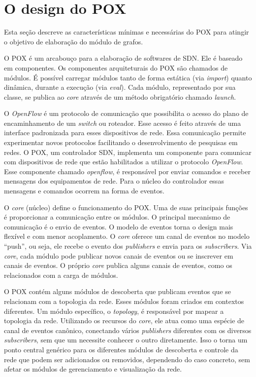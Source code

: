 \section{O design do POX}
\label{sec:design}

Esta seção descreve as características mínimas e necessárias do POX 
para atingir o objetivo de elaboração do módulo de grafos.

O POX é um arcabouço para a elaboração de softwares de SDN.
Ele é baseado em componentes.
Os componentes arquiteturais do POX são chamados de módulos.
É possível carregar módulos tanto de forma estática (via {\it import})
quanto dinâmica, durante a execução (via {\it eval}). 
Cada módulo, representado por sua classe, 
se publica ao \emph{core} através de um método obrigatório chamado \emph{launch}.

O \emph{OpenFlow} \citep{nick2008openflow} é um protocolo de comunicação
que possibilita o acesso do plano de encaminhamento de um \emph{switch} 
ou roteador.
Esse acesso é feito através de uma interface padronizada para esses
dispositivos de rede.
Essa comunicação permite experimentar novos protocolos facilitando 
o desenvolvimento de pesquisas em redes.
O POX, um controlador SDN, implementa um componente para comunicar com 
dispositivos de rede que estão habilitados a utilizar o protocolo 
\emph{OpenFlow}. 
Esse componente chamado \emph{openflow}, é responsável por enviar 
comandos e receber mensagens dos equipamentos de rede. 
Para o núcleo do controlador essas mensagens e comandos ocorrem na 
forma de eventos.

O \emph{core} (núcleo) define o funcionamento do POX. 
Uma de suas principais funções é proporcionar a comunicação entre os módulos.
O principal mecanismo de comunicação é o envio de eventos.
O modelo de eventos torna o design mais flexível e com menor acoplamento.
O \emph{core} oferece um canal de eventos no modelo ``push'',
ou seja, ele recebe o evento dos \emph{publishers} e envia para os \emph{subscribers}.
Via \emph{core}, cada módulo pode publicar novos canais de eventos 
ou se inscrever em canais de eventos.
O próprio \emph{core} publica alguns canais de eventos, 
como os relacionados com a carga de módulos.

O POX contém alguns módulos de descoberta que 
publicam eventos que se relacionam com a topologia da rede.
Esses módulos foram criados em contextos diferentes. 
Um módulo específico, o \emph{topology},
é responsável por mapear a topologia da rede. 
Utilizando os recursos do \emph{core}, 
ele atua como uma espécie de canal de eventos canônico,
conectando vários \emph{publishers} diferentes com 
os diversos \emph{subscribers}, 
sem que um necessite conhecer o outro diretamente. 
Isso o torna um ponto central genérico
para os diferentes módulos de descoberta e controle da rede 
que podem ser adicionados ou removidos, 
dependendo do caso concreto,
sem afetar os módulos de gerenciamento e visualização da rede.

